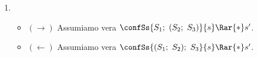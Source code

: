 {\begin{enumerate}[label=\alph*)]
    \item {} 
    \begin{itemize}
      \item $(\rightarrow)$ Assumiamo vera $\confSs{S_1; \ (S_2; \ S_3)}{s} \Rar{*} s'$.
      \item $(\leftarrow)$ Assumiamo vera $\confSs{(S_1; \ S_2); \ S_3}{s} \Rar{*} s'$.
    \end{itemize}
  \end{enumerate}
}
